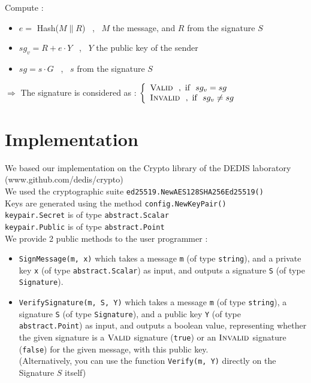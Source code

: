 \documentclass{article}
\begin{document}
Compute : \

\begin{itemize}

  \item $e =$ Hash($M \| R$) \ , \ $M$ the message, and $R$ from the signature $S$

  \item $sg_v = R + e \cdot Y$ \ , \ $Y$ the public key of the sender

  \item $sg = s \cdot G$ \ , \ $s$ from the signature $S$

\end{itemize}

$\Rightarrow$ The signature is considered as :
	$
    \left\{
        \begin{array}{ll}
        	\textsc{Valid} \ \ , \  \text{if } \ sg_v = sg \\
        	\textsc{Invalid} \ \ , \  \text{if } \ sg_v \neq sg
        \end{array}
    \right.
  $



\section{Implementation}

We based our implementation on the Crypto library of the DEDIS laboratory (www.github.com/dedis/crypto) \\

\noindent
We used the cryptographic suite \verb|ed25519.NewAES128SHA256Ed25519()| \\

\noindent
Keys are generated using the method \verb|config.NewKeyPair()| \\
\verb|keypair.Secret| is of type \verb|abstract.Scalar| \\
\verb|keypair.Public| is of type \verb|abstract.Point| \\


We provide 2 public methods to the user programmer :

\begin{itemize}

    \item \verb|SignMessage(m, x)|
    which takes a message \verb|m| (of type \verb|string|), and a private key \verb|x| (of type \verb|abstract.Scalar|) as input, and outputs a signature \verb|S| (of type \verb|Signature|).

    \item \verb|VerifySignature(m, S, Y)|
    which takes a message \verb|m| (of type \verb|string|), a signature \verb|S| (of type \verb|Signature|), and a public key \verb|Y| (of type \verb|abstract.Point|) as input, and outputs a boolean value, representing whether the given signature is a $\textsc{Valid}$ signature (\verb|true|) or an $\textsc{Invalid}$ signature (\verb|false|) for the given message, with this public key. \\
    (Alternatively, you can use the function \verb|Verify(m, Y)| directly on the Signature $S$ itself)

\end{itemize}
\end{document}
